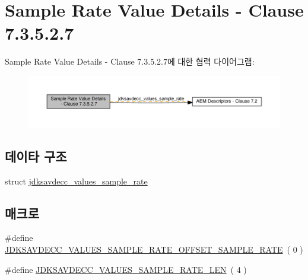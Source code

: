 \hypertarget{group__values__sample__rate}{}\section{Sample Rate Value Details -\/ Clause 7.3.5.2.7}
\label{group__values__sample__rate}
Sample Rate Value Details -\/ Clause 7.3.5.2.7에 대한 협력 다이어그램\+:
\nopagebreak
\begin{figure}[H]
\begin{center}
\leavevmode
\includegraphics[width=350pt]{group__values__sample__rate}
\end{center}
\end{figure}
\subsection*{데이타 구조}
\begin{DoxyCompactItemize}
\item 
struct \hyperlink{structjdksavdecc__values__sample__rate}{jdksavdecc\+\_\+values\+\_\+sample\+\_\+rate}
\end{DoxyCompactItemize}
\subsection*{매크로}
\begin{DoxyCompactItemize}
\item 
\#define \hyperlink{group__values__sample__rate_gaf29b13a09308cac988def8da251a6d72}{J\+D\+K\+S\+A\+V\+D\+E\+C\+C\+\_\+\+V\+A\+L\+U\+E\+S\+\_\+\+S\+A\+M\+P\+L\+E\+\_\+\+R\+A\+T\+E\+\_\+\+O\+F\+F\+S\+E\+T\+\_\+\+S\+A\+M\+P\+L\+E\+\_\+\+R\+A\+TE}~( 0 )
\item 
\#define \hyperlink{group__values__sample__rate_gaad452561921ec551b005ee9df89ed3b0}{J\+D\+K\+S\+A\+V\+D\+E\+C\+C\+\_\+\+V\+A\+L\+U\+E\+S\+\_\+\+S\+A\+M\+P\+L\+E\+\_\+\+R\+A\+T\+E\+\_\+\+L\+EN}~( 4 )
\end{DoxyCompactItemize}
